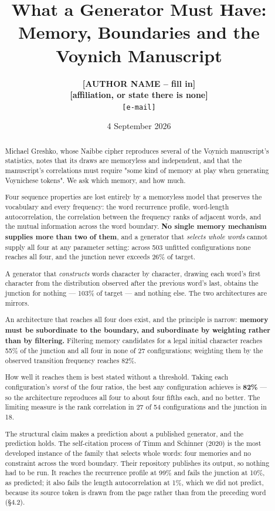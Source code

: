 \documentclass[11pt,a4paper]{article}
\title{What a Generator Must Have: Memory, Boundaries and the Voynich Manuscript}
\author{\textbf{[AUTHOR NAME -- fill in]}\\\textbf{[affiliation, or state there is none]}\\\texttt{[e-mail]}}
\date{4 September 2026}
\begin{document}
\maketitle

\begin{abstract}
Michael Greshko, whose Naibbe cipher reproduces several of the Voynich manuscript's statistics, notes that its draws are memoryless and independent, and that the manuscript's correlations must require "some kind of memory at play when generating Voynichese tokens". We ask which memory, and how much.


Four sequence properties are lost entirely by a memoryless model that preserves the vocabulary and every frequency: the word recurrence profile, word-length autocorrelation, the correlation between the frequency ranks of adjacent words, and the mutual information across the word boundary. \textbf{No single memory mechanism supplies more than two of them}, and a generator that \emph{selects whole words} cannot supply all four at any parameter setting: across 503 unfitted configurations none reaches all four, and the junction never exceeds 26\% of target.


A generator that \emph{constructs} words character by character, drawing each word's first character from the distribution observed after the previous word's last, obtains the junction for nothing --- 103\% of target --- and nothing else. The two architectures are mirrors.


An architecture that reaches all four does exist, and the principle is narrow: \textbf{memory must be subordinate to the boundary, and subordinate by weighting rather than by filtering.} Filtering memory candidates for a legal initial character reaches 55\% of the junction and all four in none of 27 configurations; weighting them by the observed transition frequency reaches 82\%.


How well it reaches them is best stated without a threshold. Taking each configuration's \emph{worst} of the four ratios, the best any configuration achieves is \textbf{82\%} --- so the architecture reproduces all four to about four fifths each, and no better. The limiting measure is the rank correlation in 27 of 54 configurations and the junction in 18.


The structural claim makes a prediction about a published generator, and the prediction holds. The self-citation process of Timm and Schinner (2020) is the most developed instance of the family that selects whole words: four memories and no constraint across the word boundary. Their repository publishes its output, so nothing had to be run. It reaches the recurrence profile at 99\% and fails the junction at 10\%, as predicted; it also fails the length autocorrelation at 1\%, which we did not predict, because its source token is drawn from the page rather than from the preceding word (\S4.2).



\end{abstract}
\end{document}
